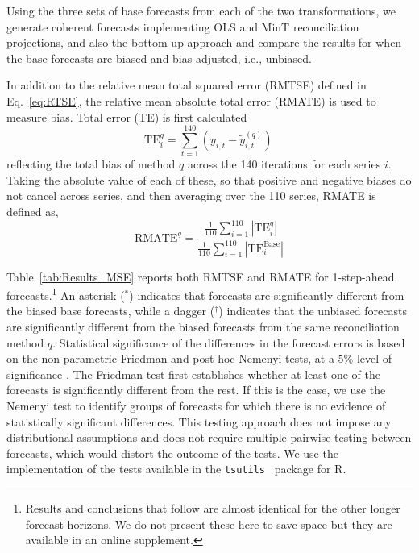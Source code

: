 \documentclass[12pt]{article}
\theoremstyle{definition}
\begin{document}
Using the three sets of base forecasts from each of the two transformations, we generate coherent forecasts implementing OLS and MinT reconciliation projections, and also the bottom-up approach and compare the results for when the base forecasts are biased and bias-adjusted, i.e., unbiased. {\color{blue} In addition to the relative mean total squared error (RMTSE) defined in Eq.~\eqref{eq:RTSE}, the relative mean absolute total error (RMATE) is used to measure bias. Total error (TE) is first calculated
\begin{equation*}
\textrm{TE}^{q}_i=\sum\limits_{t=1}^{140}(y_{i,t}-\tilde{y}^{(q)}_{i,t})\,
\end{equation*}
reflecting the total bias of method $q$ across the 140 iterations for each series $i$. Taking the absolute value of each of these, so that positive and negative biases do not cancel across series, and then averaging over the 110 series, RMATE is defined as,
\begin{equation*}
\textrm{RMATE}^{q}=\frac{\frac{1}{110}\sum\limits_{i=1}^{110}|\textrm{TE}^{q}_i|}{\frac{1}{110}\sum\limits_{i=1}^{110}|\textrm{TE}^{\textrm{Base}}_i|} \end{equation*}

Table~\ref{tab:Results_MSE} reports both RMTSE and RMATE for 1-step-ahead forecasts.\footnote{{\color{blue} Results and conclusions that follow are almost identical for the other longer forecast horizons. We do not present these here to save space but they are available in an online supplement.}}  An asterisk ($^\ast$) indicates that forecasts are significantly different from the biased base forecasts, while a dagger ($^\dag$) indicates that the unbiased forecasts are significantly different from the biased forecasts from the same reconciliation method $q$. Statistical significance of the differences in the forecast errors is based on the non-parametric Friedman and post-hoc Nemenyi tests, at a 5\% level of significance \citep{HolEtAl2013}. The Friedman test first establishes whether at least one of the forecasts is significantly different from the rest. If this is the case, we use the Nemenyi test to identify groups of forecasts for which there is no evidence of statistically significant differences. This testing approach does not impose any distributional assumptions and does not require multiple pairwise testing between forecasts, which would distort the outcome of the tests. We use the implementation of the tests available in the \verb"tsutils " \citep{tsutils} package for R.}
\end{document}
